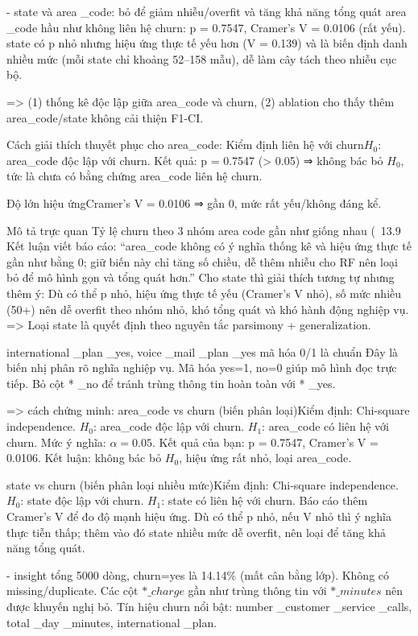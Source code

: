 - state và area \_code: bỏ để giảm nhiễu/overfit và tăng khả năng tổng quát
area \_code hầu như không liên hệ churn: p = 0.7547, Cramer's V = 0.0106 (rất yếu).
state có p nhỏ nhưng hiệu ứng thực tế yếu hơn (V = 0.139) và là biến định danh nhiều mức (mỗi state chỉ khoảng 52–158 mẫu), dễ làm cây tách theo nhiễu cục bộ.

=> (1) thống kê độc lập giữa area_code và churn, (2) ablation cho thấy thêm area_code/state không cải thiện F1-CI.

Cách giải thích thuyết phục cho area_code:
Kiểm định liên hệ với churn\(H_0\): area_code độc lập với churn.
Kết quả: p = 0.7547 (> 0.05) ⇒ không bác bỏ \(H_0\), tức là chưa có bằng chứng area_code liên hệ churn.

Độ lớn hiệu ứngCramer's V = 0.0106 ⇒ gần 0, mức rất yếu/không đáng kể.

Mô tả trực quan
Tỷ lệ churn theo 3 nhóm area code gần như giống nhau (~13.9%
Kết luận viết báo cáo:
“area_code không có ý nghĩa thống kê và hiệu ứng thực tế gần như bằng 0; giữ biến này chỉ tăng số chiều, dễ thêm nhiễu cho RF nên loại bỏ để mô hình gọn và tổng quát hơn.”
Cho state thì giải thích tương tự nhưng thêm ý:
Dù có thể p nhỏ, hiệu ứng thực tế yếu (Cramer's V nhỏ), số mức nhiều (50+) nên dễ overfit theo nhóm nhỏ, khó tổng quát và khó hành động nghiệp vụ.
=> Loại state là quyết định theo nguyên tắc parsimony + generalization.

international \_plan \_yes, voice \_mail \_plan \_yes mã hóa 0/1 là chuẩn
Đây là biến nhị phân rõ nghĩa nghiệp vụ.
Mã hóa yes=1, no=0 giúp mô hình đọc trực tiếp.
Bỏ cột * \_no để tránh trùng thông tin hoàn toàn với * \_yes.


=> cách chứng minh: area_code vs churn (biến phân loại)Kiểm định: Chi-square independence.
\(H_0\): area_code độc lập với churn.
\(H_1\): area_code có liên hệ với churn.
Mức ý nghĩa: \(\alpha = 0.05\).
Kết quả của bạn: p = 0.7547, Cramer's V = 0.0106.
Kết luận: không bác bỏ \(H_0\), hiệu ứng rất nhỏ, loại area_code.

state vs churn (biến phân loại nhiều mức)Kiểm định: Chi-square independence.
\(H_0\): state độc lập với churn.
\(H_1\): state có liên hệ với churn.
Báo cáo thêm Cramer's V để đo độ mạnh hiệu ứng.
Dù có thể p nhỏ, nếu V nhỏ thì ý nghĩa thực tiễn thấp; thêm vào đó state nhiều mức dễ overfit, nên loại để tăng khả năng tổng quát.

- insight tổng
5000 dòng, churn=yes là 14.14\% (mất cân bằng lớp).
Không có missing/duplicate.
Các cột $* \_charge$ gần như trùng thông tin với $* \_minutes$ nên được khuyến nghị bỏ.
Tín hiệu churn nổi bật: number \_customer \_service \_calls, total \_day \_minutes, international \_plan.

